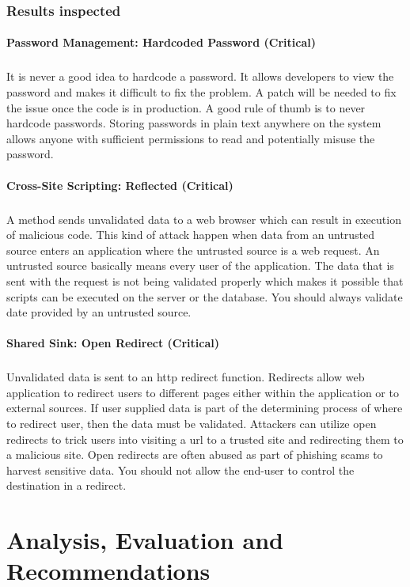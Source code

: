\documentclass[11pt,english,a4paper]{report}
\begin{document}
\subsection{Results inspected}
\subsubsection{Password Management: Hardcoded Password (Critical)}
\paragraph{}
It is never a good idea to hardcode a password.
It allows developers to view the password and makes it difficult to fix the problem. 
A patch will be needed to fix the issue once the code is in production.
A good rule of thumb is to never hardcode passwords.
Storing passwords in plain text anywhere on the system allows anyone with sufficient permissions to read and potentially misuse the password.


\subsubsection{Cross-Site Scripting: Reflected (Critical)}
\paragraph{}
A method sends unvalidated data to a web browser which can result in execution of malicious code.
This kind of attack happen when data from an untrusted source enters an application where the untrusted source is a web request.
An untrusted source basically means every user of the application.
The data that is sent with the request is not being validated properly which makes it possible that scripts can be executed on the server or the database.
You should always validate date provided by an untrusted source.


\subsubsection{Shared Sink: Open Redirect (Critical)}
\paragraph{}
Unvalidated data is sent to an \gls{http} redirect function. 
Redirects allow web application to redirect users to different pages either within the application or to external sources.
If user supplied data is part of the determining process of where to redirect user, then the data must be validated.
Attackers can utilize open redirects to trick users into visiting a \gls{url} to a trusted site and redirecting them to a malicious site.
Open redirects are often abused as part of phishing scams to harvest sensitive data.
You should not allow the end-user to control the destination in a redirect.



\chapter{Analysis, Evaluation and Recommendations}
\label{cha:part3}
\newpage




\end{document}
